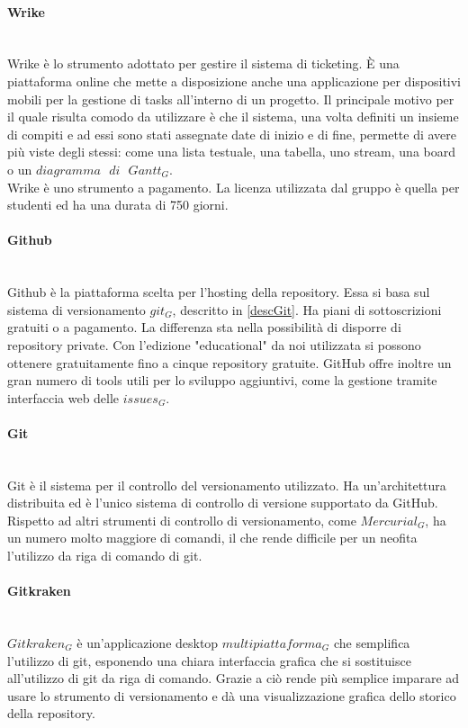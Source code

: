 		\paragraph{Wrike} \mbox{} \\
		Wrike è lo strumento adottato per gestire il sistema di ticketing. È una piattaforma online che mette a disposizione anche una applicazione per dispositivi mobili per la gestione di tasks all'interno di un progetto. Il principale motivo per il quale risulta comodo da utilizzare è che il sistema, una volta definiti un insieme di compiti e ad essi sono stati  assegnate date di inizio e di fine, permette di avere più viste degli stessi: come una lista testuale, una tabella, uno stream, una board o un $diagramma\text{ }di\text{ }Gantt_G$. \\ Wrike è uno strumento a pagamento. La licenza utilizzata dal gruppo è quella per studenti ed ha una durata di 750 giorni.
		
		\paragraph{Github} \mbox{} \\
		Github è la piattaforma scelta per l'hosting della repository. Essa si basa sul sistema di versionamento $git_G$, descritto in \ref{descGit}. Ha piani di sottoscrizioni gratuiti o a pagamento. La differenza sta nella possibilità di disporre di repository private. Con l'edizione "educational" da noi utilizzata si possono ottenere gratuitamente fino a cinque repository gratuite. GitHub offre inoltre un gran numero di tools utili per lo sviluppo aggiuntivi, come la gestione tramite interfaccia web delle $issues_G$.
		
		\paragraph{Git} \mbox{} \\
		Git\label{descGit} è il sistema per il controllo del versionamento utilizzato. Ha un'architettura distribuita ed è l'unico sistema di controllo di versione supportato da GitHub. Rispetto ad altri strumenti di controllo di versionamento, come $Mercurial_G$, ha un numero molto maggiore di comandi, il che rende difficile per un neofita l'utilizzo da riga di comando di git.
		
		\paragraph{Gitkraken} \mbox{} \\
		$Gitkraken_G$ è un'applicazione desktop $multipiattaforma_G$ che semplifica l'utilizzo di git, esponendo una chiara interfaccia grafica che si sostituisce all'utilizzo di git da riga di comando. Grazie a ciò rende più semplice imparare ad usare lo strumento di versionamento e dà una visualizzazione grafica dello storico della repository.
		
